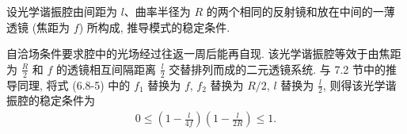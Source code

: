 \documentclass{note}
\begin{document}
\begin{exe}
    设光学谐振腔由间距为 $l$、曲率半径为 $R$ 的两个相同的反射镜和放在中间的一薄透镜 (焦距为 $f$) 所构成, 推导模式的稳定条件.
\end{exe}
\begin{sol}
    自洽场条件要求腔中的光场经过往返一周后能再自现. 该光学谐振腔等效于由焦距为 $\frac{R}{2}$ 和 $f$ 的透镜相互间隔距离 $\frac{l}{2}$ 交替排列而成的二元透镜系统.
    与 7.2 节中的推导同理, 将式 (6.8-5) 中的 $f_1$ 替换为 $f$, $f_2$ 替换为 $R/2$, $l$ 替换为 $\frac{l}{2}$, 则得该光学谐振腔的稳定条件为
    \begin{align}
        0\leq\left(1-\frac{l}{4f}\right)\left(1-\frac{l}{2R}\right)\leq 1.
    \end{align}
\end{sol}
\end{document}
